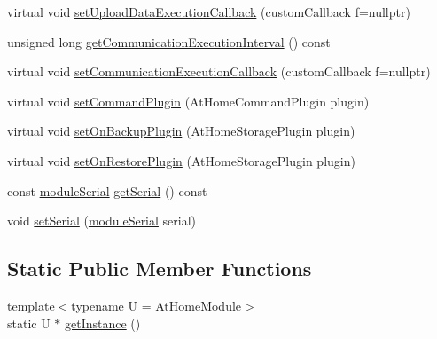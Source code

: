 \begin{DoxyCompactItemize}
\item 
virtual void \mbox{\hyperlink{classathome_1_1module_1_1_at_home_module_ae27ce52a7171a2cf3a78c5d8f70c2d1d}{set\+Upload\+Data\+Execution\+Callback}} (custom\+Callback f=nullptr)
\item 
unsigned long \mbox{\hyperlink{classathome_1_1module_1_1_at_home_module_a263fe0bea2fa480b3885fee07e2a8221}{get\+Communication\+Execution\+Interval}} () const
\item 
virtual void \mbox{\hyperlink{classathome_1_1module_1_1_at_home_module_a2a89b7e4cd63739b2c48ffbe3bbaf9be}{set\+Communication\+Execution\+Callback}} (custom\+Callback f=nullptr)
\item 
virtual void \mbox{\hyperlink{classathome_1_1module_1_1_at_home_module_a137cdd3cfb9bad5e8e65eddac89ddd41}{set\+Command\+Plugin}} (At\+Home\+Command\+Plugin plugin)
\item 
virtual void \mbox{\hyperlink{classathome_1_1module_1_1_at_home_module_aeb8a36ce4009ad6a578f41cd654877fa}{set\+On\+Backup\+Plugin}} (At\+Home\+Storage\+Plugin plugin)
\item 
virtual void \mbox{\hyperlink{classathome_1_1module_1_1_at_home_module_a7ae30173c9c2871cd374d5d6786f43f6}{set\+On\+Restore\+Plugin}} (At\+Home\+Storage\+Plugin plugin)
\item 
const \mbox{\hyperlink{classathome_1_1module_1_1_at_home_module_aaa31c8eddb689010ef59deba4e1463c6}{module\+Serial}} \mbox{\hyperlink{classathome_1_1module_1_1_at_home_module_a1267bc33e38b25ba52bceddc60ea7df1}{get\+Serial}} () const
\item 
void \mbox{\hyperlink{classathome_1_1module_1_1_at_home_module_a053f38453530fd881376ed1596a14e09}{set\+Serial}} (\mbox{\hyperlink{classathome_1_1module_1_1_at_home_module_aaa31c8eddb689010ef59deba4e1463c6}{module\+Serial}} serial)
\end{DoxyCompactItemize}
\subsection*{Static Public Member Functions}
\begin{DoxyCompactItemize}
\item 
{\footnotesize template$<$typename U  = At\+Home\+Module$>$ }\\static U $\ast$ \mbox{\hyperlink{classathome_1_1module_1_1_at_home_module_acc6e7fc0d86f11648fd81729484e546f}{get\+Instance}} ()
\end{DoxyCompactItemize}
